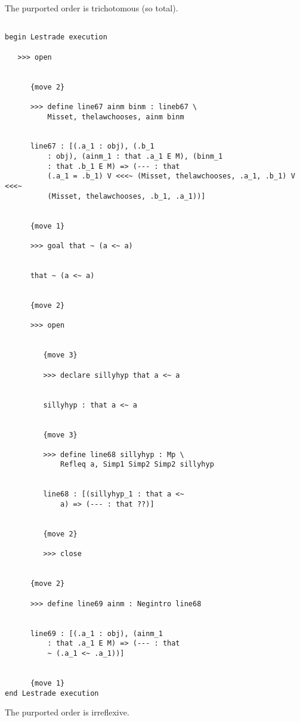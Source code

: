 \documentclass[12pt]{article}
\begin{document}
The purported order is trichotomous (so total).

\begin{verbatim}

begin Lestrade execution

   >>> open


      {move 2}

      >>> define line67 ainm binm : lineb67 \
          Misset, thelawchooses, ainm binm


      line67 : [(.a_1 : obj), (.b_1 
          : obj), (ainm_1 : that .a_1 E M), (binm_1 
          : that .b_1 E M) => (--- : that 
          (.a_1 = .b_1) V <<<~ (Misset, thelawchooses, .a_1, .b_1) V <<<~ 
          (Misset, thelawchooses, .b_1, .a_1))]


      {move 1}

      >>> goal that ~ (a <~ a)


      that ~ (a <~ a)


      {move 2}

      >>> open


         {move 3}

         >>> declare sillyhyp that a <~ a


         sillyhyp : that a <~ a


         {move 3}

         >>> define line68 sillyhyp : Mp \
             Refleq a, Simp1 Simp2 Simp2 sillyhyp


         line68 : [(sillyhyp_1 : that a <~ 
             a) => (--- : that ??)]


         {move 2}

         >>> close


      {move 2}

      >>> define line69 ainm : Negintro line68


      line69 : [(.a_1 : obj), (ainm_1 
          : that .a_1 E M) => (--- : that 
          ~ (.a_1 <~ .a_1))]


      {move 1}
end Lestrade execution
\end{verbatim}

The purported order is irreflexive.
\end{document}
